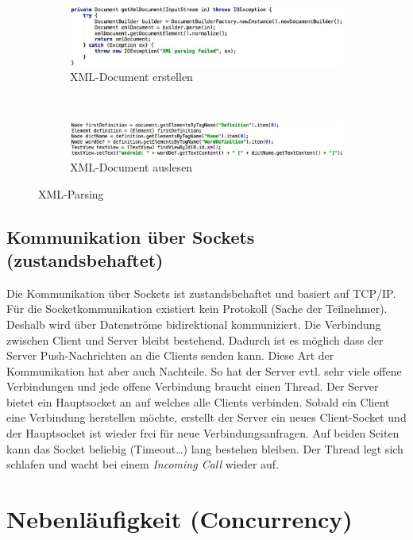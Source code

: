 \begin{figure}
	\centering
	\begin{subfigure}[b]{0.48\textwidth}
		\includegraphics[width=\textwidth]{fig/xml-document-erstellen}
		\caption{XML-Document erstellen}
	\end{subfigure}
	~
	\begin{subfigure}[b]{0.48\textwidth}
		\includegraphics[width=\textwidth]{fig/xml-document-auslesen}
		\caption{XML-Document auslesen}
	\end{subfigure}
	\caption{XML-Parsing}
	\label{fig:xml}
\end{figure}

\subsection{Kommunikation über Sockets (zustandsbehaftet)}

Die Kommunikation über Sockets ist zustandsbehaftet und basiert auf TCP/IP. Für die Socketkommunikation existiert kein Protokoll (Sache der Teilnehmer). Deshalb wird über Datenströme bidirektional kommuniziert. Die Verbindung zwischen Client und Server bleibt bestehend. Dadurch ist es möglich dass der Server Push-Nachrichten an die Clients senden kann. Diese Art der Kommunikation hat aber auch Nachteile. So hat der Server evtl. sehr viele offene Verbindungen und jede offene Verbindung braucht einen Thread.
Der Server bietet ein Hauptsocket an auf welches alle Clients verbinden. Sobald ein Client eine Verbindung herstellen möchte, erstellt der Server ein neues Client-Socket und der Hauptsocket ist wieder frei für neue Verbindungsanfragen. Auf beiden Seiten kann das Socket beliebig (Timeout\dots) lang bestehen bleiben. Der Thread legt sich schlafen und wacht bei einem \emph{Incoming Call} wieder auf.

\section{Nebenläufigkeit (Concurrency)}

